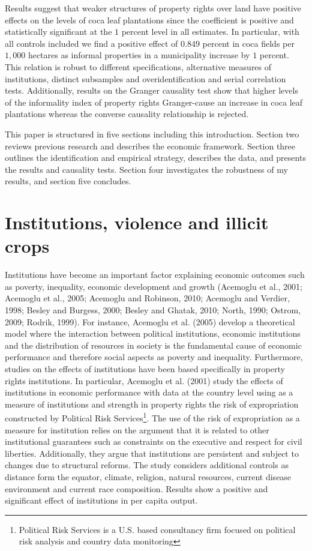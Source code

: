 Results suggest that weaker structures of property rights over land have positive effects on the levels of coca leaf plantations since the coefficient is positive and statistically significant at the $1$ percent level in all estimates. In particular, with all controls included we find a positive effect of $0.849$ percent in coca fields per $1,000$ hectares as informal properties in a municipality increase by $1$ percent. This relation is robust to different specifications, alternative measures of institutions, distinct subsamples and overidentification and serial correlation tests. Additionally, results on the Granger causality test show that higher levels of the informality index of property rights Granger-cause an increase in coca leaf plantations whereas the converse causality relationship is rejected.

This paper is structured in five sections including this introduction. Section two reviews previous research and describes the economic framework. Section three outlines the identification and empirical strategy, describes the data, and presents the results and causality tests. Section four investigates the robustness of my results, and section five concludes.

\section{Institutions, violence and illicit crops}
\label{previous_res}

Institutions have become an important factor explaining economic outcomes such as poverty, inequality, economic development and growth (Acemoglu et al., 2001; Acemoglu et al., 2005; Acemoglu and Robinson, 2010; Acemoglu and Verdier, 1998; Besley and Burgess, 2000; Besley and Ghatak, 2010; North, 1990; Ostrom, 2009; Rodrik, 1999). For instance, Acemoglu et al. (2005) develop a theoretical model where the interaction between political institutions, economic institutions and the distribution of resources in society is the fundamental cause of economic performance and therefore social aspects as poverty and inequality. Furthermore, studies on the effects of institutions have been based specifically in property rights institutions. In particular, Acemoglu et al. (2001) study the effects of institutions in economic performance with data at the country level using as a measure of institutions and strength in property rights the risk of expropriation constructed by Political Risk Services\footnote{Political Risk Services is a U.S. based consultancy firm focused on political risk analysis and country data monitoring}. The use of the risk of expropriation as a measure for institution relies on the argument that it is related to other institutional guarantees such as constraints on the executive and respect for civil liberties. Additionally, they argue that institutions are persistent and subject to changes due to structural reforms. The study considers additional controls as distance form the equator, climate, religion, natural resources, current disease environment and current race composition. Results show a positive and significant effect of institutions in per capita output.

